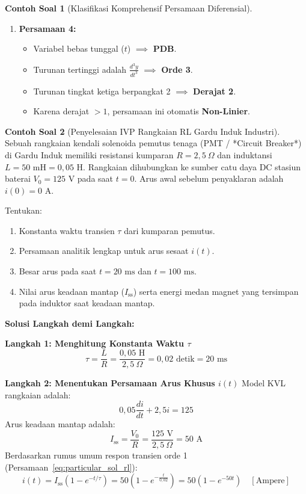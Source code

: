 \documentclass[11pt,a4paper]{article}
\theoremstyle{definition}
\newtheorem{example}{Contoh Soal}[section]
\begin{document}
\begin{example}[Klasifikasi Komprehensif Persamaan Diferensial]
\begin{enumerate}[leftmargin=*]
    \item \textbf{Persamaan 4:}
    \begin{itemize}
        \item Variabel bebas tunggal ($t$) $\implies$ \textbf{PDB}.
        \item Turunan tertinggi adalah $\frac{d^3 y}{dt^3}$ $\implies$ \textbf{Orde 3}.
        \item Turunan tingkat ketiga berpangkat 2 $\implies$ \textbf{Derajat 2}.
        \item Karena derajat $>1$, persamaan ini otomatis \textbf{Non-Linier}.
    \end{itemize}
\end{enumerate}
\end{example}

\begin{example}[Penyelesaian IVP Rangkaian RL Gardu Induk Industri]
Sebuah rangkaian kendali solenoida pemutus tenaga (PMT / *Circuit Breaker*) di Gardu Induk memiliki resistansi kumparan $R = 2{,}5\ \Omega$ dan induktansi $L = 50\text{ mH} = 0{,}05\text{ H}$. Rangkaian dihubungkan ke sumber catu daya DC stasiun baterai $V_0 = 125\text{ V}$ pada saat $t = 0$. Arus awal sebelum penyaklaran adalah $i(0) = 0\text{ A}$.

Tentukan:
\begin{enumerate}
    \item Konstanta waktu transien $\tau$ dari kumparan pemutus.
    \item Persamaan analitik lengkap untuk arus sesaat $i(t)$.
    \item Besar arus pada saat $t = 20\text{ ms}$ dan $t = 100\text{ ms}$.
    \item Nilai arus keadaan mantap ($I_{\text{ss}}$) serta energi medan magnet yang tersimpan pada induktor saat keadaan mantap.
\end{enumerate}

\textbf{Solusi Langkah demi Langkah:}

\textbf{Langkah 1: Menghitung Konstanta Waktu $\tau$}
\begin{equation}
    \tau = \frac{L}{R} = \frac{0{,}05\text{ H}}{2{,}5\ \Omega} = 0{,}02\text{ detik} = 20\text{ ms}
\end{equation}

\textbf{Langkah 2: Menentukan Persamaan Arus Khusus $i(t)$}
Model KVL rangkaian adalah:
\begin{equation}
    0{,}05 \frac{di}{dt} + 2{,}5 i = 125
\end{equation}
Arus keadaan mantap adalah:
\begin{equation}
    I_{\text{ss}} = \frac{V_0}{R} = \frac{125\text{ V}}{2{,}5\ \Omega} = 50\text{ A}
\end{equation}
Berdasarkan rumus umum respon transien orde 1 (Persamaan~\eqref{eq:particular_sol_rl}):
\begin{equation}
    i(t) = I_{\text{ss}} (1 - e^{-t/\tau}) = 50 \left( 1 - e^{-\frac{t}{0{,}02}} \right) = 50 (1 - e^{-50t})\quad [\text{Ampere}]
\end{equation}


\end{example}
\end{document}
